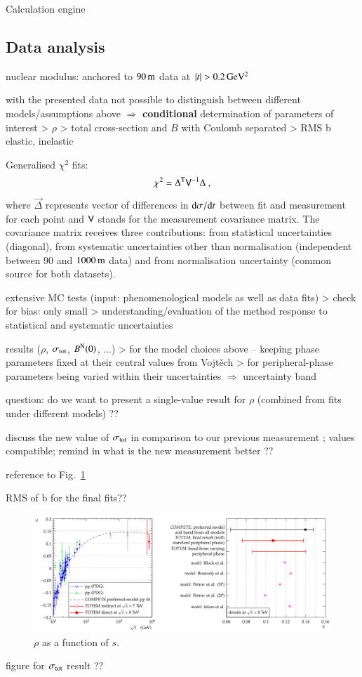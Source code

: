 Calculation engine \cite{elegent}

\subsection{Data analysis}
\label{sec:cni_anal}

\> nuclear modulus: anchored to $90\,{\rm m}$ data at $|t| > 0.2\,{\rm GeV^2}$

\> with the presented data not possible to distinguish between different models/assumptions above $\Rightarrow$ {\bf conditional} determination of parameters of interest
\>> $\rho$
\>> total cross-section and $B$ with Coulomb separated
\>> RMS b elastic, inelastic


Generalised $\chi^2$ fits:
\begin{equation}
\label{eq:chi sq}
	\chi^2 = \Delta^{\rm T} \mathsf{V}^{-1} \Delta\ ,
\end{equation}
where $\vec\Delta$ represents vector of differences in ${\rm d}\sigma/{\rm d} t$ between fit and measurement for each point and $\mathsf{V}$ stands for the measurement covariance matrix. The covariance matrix receives three contributions: from statistical uncertainties (diagonal), from systematic uncertainties other than normalisation (independent between $90$ and $1000\,{\rm m}$ data) and from normalisation uncertainty (common source for both datasets).

\> extensive MC tests (input: phenomenological models as well as data fits)
\>> check for bias: only small
\>> understanding/evaluation of the method response to statistical and systematic uncertainties

\> results ($\rho$, $\sigma_{\rm tot}$, $B^{\rm N}(0)$, ...)
\>> for the model choices above -- keeping phase parameters fixed at their central values from Vojt\v ech
\>> for peripheral-phase parameters being varied within their uncertainties $\Rightarrow$ uncertainty band

\> question: do we want to present a single-value result for $\rho$ (combined from fits under different models) ??

\> discuss the new value of $\sigma_{\rm tot}$ in comparison to our previous measurement \cite{prl111}; values compatible; remind in what is the new measurement better ??

\> reference to Fig.~\ref{fig:rho_s}

\> RMS of b for the final fits??

\begin{figure}
\begin{center}
\includegraphics[width=16cm]{fig/rho_s.pdf}
\vskip-3mm
\caption{$\rho$ as a function of $s$.}
\label{fig:rho_s}
\end{center}
\end{figure}

\> figure for $\sigma_{\rm tot}$ result ??
